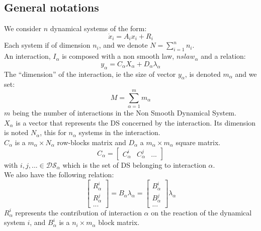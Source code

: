 \documentclass[10pt]{report}
\begin{document}
\subsection{General notations}
We consider $n$ dynamical systems of the form:
\begin{equation}
\dot x_i = A_i x_i + R_i 
\end{equation}
Each system if of dimension $n_i$, and we denote $N = \displaystyle{\sum_{i=1}^{n} n_i}$. \\
An interaction, $I_{\alpha}$ is composed with a non smooth law, $nslaw_{\alpha}$ and a relation:
\begin{equation}
y_{\alpha} = C_{\alpha}X_{\alpha} + D_{\alpha}\lambda_{\alpha}
\end{equation}
The ``dimension'' of the interaction, ie the size of vector $y_{\alpha}$, is denoted $m_{\alpha}$ and we set: 
$$ M = \sum_{\alpha=1}^{m} m_{\alpha}$$
$m$ being the number of interactions in the Non Smooth Dynamical System.  \\
$X_{\alpha}$ is a vector that represents the DS concerned by the interaction. Its dimension is noted $N_{\alpha}$, this for $n_{\alpha}$ systems in the interaction. \\
$C_{\alpha}$ is a $m_{\alpha} \times N_{\alpha}$ row-blocks matrix and $D_{\alpha}$ a $m_{\alpha} \times m_{\alpha}$ square matrix. \\
\begin{equation}
C_{\alpha}=\left[\begin{array}{ccc} 
C_{\alpha}^i & C_{\alpha}^j & ...\end{array}\right]
\end{equation}
with $i,j,...\in \mathcal{DS}_{\alpha}$ which is the set of DS belonging to interaction $\alpha$.\\
We also have the following relation: 
\begin{equation}
\left[\begin{array}{c} 
R_{\alpha}^i \\
R_{\alpha}^j \\
...  
\end{array}\right] = B_{\alpha}\lambda_{\alpha}
=\left[\begin{array}{c} 
B_{\alpha}^i \\
B_{\alpha}^j \\
...
\end{array}\right]\lambda_{\alpha}
\end{equation}
$R_{\alpha}^i$ represents the contribution of interaction $\alpha$ on the reaction of the dynamical system $i$, and $B_{\alpha}^i$ is a $n_i \times m_{\alpha}$ block matrix. \\ 
\end{document}
